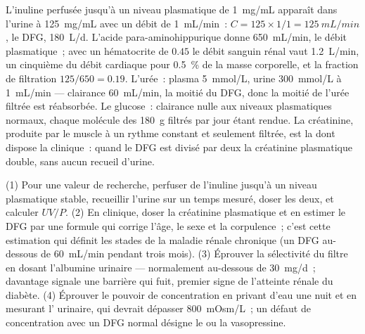 \begin{example}\label{ex:b3:renal-osmoregulation:numbers}
L'inuline perfusée jusqu'à un niveau plasmatique de \qty{1}{mg/mL}
apparaît dans l'urine à \qty{125}{mg/mL} avec un débit de
\qty{1}{mL/min}~: $C = 125\times 1/1 =
\qty{125}{mL/min}$, le DFG, \qty{180}{L/d}. L'acide
para-aminohippurique donne \qty{650}{mL/min}, le débit plasmatique~;
avec un hématocrite de $0.45$ le débit sanguin rénal vaut
\qty{1.2}{L/min}, un cinquième du débit cardiaque pour \qty{0.5}{\%} de
la masse corporelle, et la fraction de filtration $125/650 = 0.19$.
L'urée~: plasma \qty{5}{mmol/L}, urine \qty{300}{mmol/L} à
\qty{1}{mL/min} --- clairance \qty{60}{mL/min}, la moitié du DFG, donc
la moitié de l'urée filtrée est réabsorbée. Le glucose~: clairance nulle
aux niveaux plasmatiques normaux, chaque molécule des \qty{180}{g}
filtrés par jour étant rendue. La créatinine, produite par le muscle à
un rythme constant et seulement filtrée, est la  dont
dispose la clinique~: quand le DFG est divisé par deux la créatinine
plasmatique double, sans aucun recueil d'urine.
\end{example}

\begin{method}\label{met:b3:renal-osmoregulation:gfr}
(1) Pour une valeur de recherche, perfuser de l'inuline jusqu'à un
niveau plasmatique stable, recueillir l'urine sur un temps mesuré,
doser les deux, et calculer $UV/P$. (2) En clinique, doser la
créatinine plasmatique et en estimer le DFG par une formule qui corrige
l'âge, le sexe et la corpulence~; c'est cette estimation qui définit les
stades de la maladie rénale chronique (un DFG au-dessous de
\qty{60}{mL/min} pendant trois mois). (3) Éprouver la sélectivité du
filtre en dosant l'albumine urinaire --- normalement au-dessous de
\qty{30}{mg/d}~; davantage signale une barrière qui fuit, premier
signe de l'atteinte rénale du diabète. (4) Éprouver le pouvoir de
concentration en privant d'eau une nuit et en mesurant l'
urinaire, qui devrait dépasser \qty{800}{mOsm/L}~; un défaut de
concentration avec un DFG normal désigne le  ou la
vasopressine.
\end{method}

